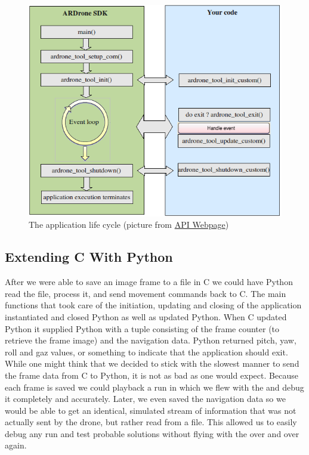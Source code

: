 \begin{figure}[h!]
    \centering
        \includegraphics[scale=0.6]{mainloop.png}
    \caption{The application life cycle (picture from \href{https://projects.ardrone.org/embedded/ardrone-api/index.html}{\Ardrone API Webpage})}
    \label{mainloop}
\end{figure}

\subsection{Extending C With Python}
After we were able to save an image frame to a file in C we could have Python read the file, process it, and send movement commands back to C. The main functions 
that took care of the initiation, updating and closing of the application instantiated and closed Python as well as updated Python. When C updated Python it supplied
Python with a tuple consisting of the frame counter (to retrieve the frame
image) and the navigation data. Python returned pitch, yaw, roll and gaz values, or something
to indicate that the application should exit. \\

While one might think that we decided to stick with the slowest manner to send the frame data from C to Python, it is not as bad as one would expect. Because each frame is
saved we could playback a run in which we flew with the \Ardrone and debug it completely and accurately. Later, we even saved the navigation data so we would be able to 
get an identical, simulated stream of information that was not actually sent by
the drone, but rather read from a file. This allowed us to easily debug any run and test 
probable solutions without flying with the \Ardrone over and over again. \\

